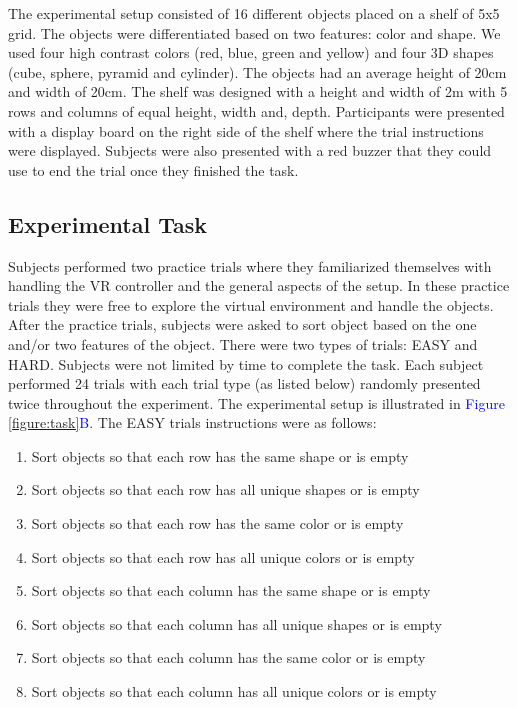 The experimental setup consisted of 16 different objects placed on a shelf of 5x5 grid. The objects were differentiated based on two features: color and shape. We used four high contrast colors (red, blue, green and yellow) and four 3D shapes (cube, sphere, pyramid and cylinder). The objects had an average height of 20cm and width of 20cm. The shelf was designed with a height and width of 2m with 5 rows and columns of equal height, width and, depth. Participants were presented with a display board on the right side of the shelf where the trial instructions were displayed. Subjects were also presented with a red buzzer that they could use to end the trial once they finished the task. 



\subsection{Experimental Task}
Subjects performed two practice trials where they familiarized themselves with handling the VR controller and the general aspects of the setup. In these practice trials they were free to explore the virtual environment and handle the objects. After the practice trials, subjects were asked to sort object based on the one and/or two features of the object. There were two types of trials: EASY and HARD. Subjects were not limited by time to complete the task. Each subject performed 24 trials with each trial type (as listed below) randomly presented twice throughout the experiment. The experimental setup is illustrated in \textcolor{Blue}{Figure \ref{figure:task}B}.
The EASY trials instructions were as follows:
\begin{enumerate}
    \item Sort objects so that each row has the same shape or is empty
    \item Sort objects so that each row has all unique shapes or is empty
    \item Sort objects so that each row has the same color or is empty
    \item Sort objects so that each row has all unique colors or is empty
    \item Sort objects so that each column has the same shape or is empty
    \item Sort objects so that each column has all unique shapes or is empty
    \item Sort objects so that each column has the same color or is empty
    \item Sort objects so that each column has all unique colors or is empty
\end{enumerate}
